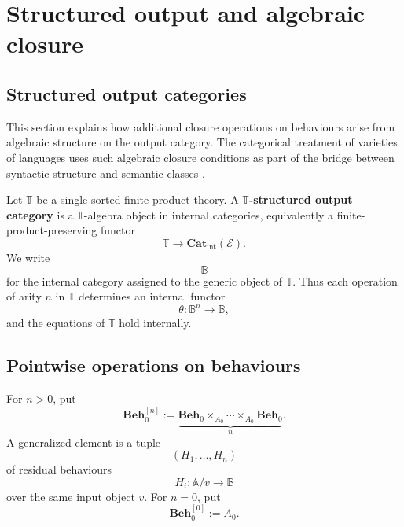 \section{Structured output and algebraic closure}
\label{sec:structured-output-algebraic-closure}

\subsection{Structured output categories}
\label{subsec:structured-output-categories}

This section explains how additional closure operations on behaviours arise
from algebraic structure on the output category. The categorical treatment of
varieties of languages uses such algebraic closure conditions as part of the
bridge between syntactic structure and semantic classes
\cite{Eilenberg1974,AdamekMiliusMyersUrbat2019TOCL,Salamanca2016Monad}.

\begin{definition}
\label{def:structured-output-category}
    Let \(\mathbb T\) be a single-sorted finite-product theory. A
    \textbf{\(\mathbb T\)-structured output category} is a \(\mathbb T\)-algebra
    object in internal categories, equivalently a finite-product-preserving
    functor
    \[
        \mathbb T\longrightarrow \mathbf{Cat}_{\mathrm{int}}(\mathcal E).
    \]
    We write
    \[
        \mathbb B
    \]
    for the internal category assigned to the generic object of \(\mathbb T\).
    Thus each operation of arity \(n\) in \(\mathbb T\) determines an internal
    functor
    \[
        \theta:\mathbb B^n\to\mathbb B,
    \]
    and the equations of \(\mathbb T\) hold internally.
\end{definition}

\subsection{Pointwise operations on behaviours}
\label{subsec:pointwise-operations-behaviours}

For \(n>0\), put
\[
    \mathbf{Beh}_0^{[n]}
    :=
    \underbrace{
    \mathbf{Beh}_0
    \times_{A_0}
    \cdots
    \times_{A_0}
    \mathbf{Beh}_0
    }_{n}.
\]
A generalized element is a tuple
\[
    (H_1,\dots,H_n)
\]
of residual behaviours
\[
    H_i:\mathbb A/v\to\mathbb B
\]
over the same input object \(v\). For \(n=0\), put
\[
    \mathbf{Beh}_0^{[0]}:=A_0.
\]

